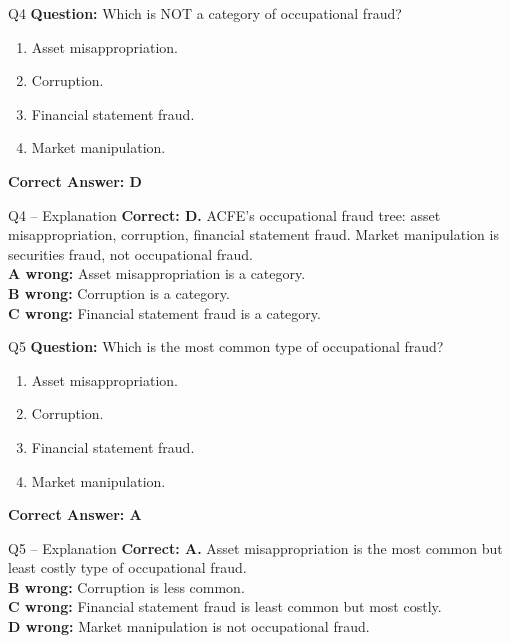 \documentclass[aspectratio=169,10pt]{beamer}
\begin{document}
	\begin{frame}[t]{Q4}
		\small
		\textbf{Question:} Which is NOT a category of occupational fraud?
		\begin{enumerate}[label=\Alph*.,itemsep=1pt,topsep=2pt]
			\item Asset misappropriation.
			\item Corruption.
			\item Financial statement fraud.
			\item Market manipulation.
		\end{enumerate}
		\vspace{4pt}
		\textbf{Correct Answer: D}
	\end{frame}
	
	\begin{frame}[t]{Q4 -- Explanation}
		\small
		\textbf{Correct: D.} ACFE's occupational fraud tree: asset misappropriation, corruption, financial statement fraud. Market manipulation is securities fraud, not occupational fraud. \\[4pt]
		\textbf{A wrong:} Asset misappropriation is a category. \\[2pt]
		\textbf{B wrong:} Corruption is a category. \\[2pt]
		\textbf{C wrong:} Financial statement fraud is a category.
	\end{frame}
	
	\begin{frame}[t]{Q5}
		\small
		\textbf{Question:} Which is the most common type of occupational fraud?
		\begin{enumerate}[label=\Alph*.,itemsep=1pt,topsep=2pt]
			\item Asset misappropriation.
			\item Corruption.
			\item Financial statement fraud.
			\item Market manipulation.
		\end{enumerate}
		\vspace{4pt}
		\textbf{Correct Answer: A}
	\end{frame}
	
	\begin{frame}[t]{Q5 -- Explanation}
		\small
		\textbf{Correct: A.} Asset misappropriation is the most common but least costly type of occupational fraud. \\[4pt]
		\textbf{B wrong:} Corruption is less common. \\[2pt]
		\textbf{C wrong:} Financial statement fraud is least common but most costly. \\[2pt]
		\textbf{D wrong:} Market manipulation is not occupational fraud.
	\end{frame}
	
\end{document}
